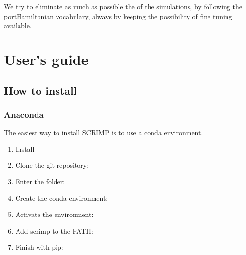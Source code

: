 \documentclass[letterpaper,10pt,english]{sphinxmanual}
\begin{document}
\sphinxAtStartPar
We try to eliminate as much as possible the  of the simulations, by following the port\sphinxhyphen{}Hamiltonian vocabulary, always by keeping the possibility of fine tuning available.


\chapter{User’s guide}
\label{\detokenize{index:user-s-guide}}
\sphinxstepscope


\section{How to install}
\label{\detokenize{install:how-to-install}}\label{\detokenize{install::doc}}

\subsection{Anaconda}
\label{\detokenize{install:anaconda}}
\sphinxAtStartPar
The easiest way to install SCRIMP is to use a conda environment.
\begin{enumerate}
%
\item {} 
\sphinxAtStartPar
Install 

\item {} 
\sphinxAtStartPar
Clone the git repository: 

\item {} 
\sphinxAtStartPar
Enter the folder: 

\item {} 
\sphinxAtStartPar
Create the conda environment:  

\item {} 
\sphinxAtStartPar
Activate the environment:  

\item {} 
\sphinxAtStartPar
Add scrimp to the PATH: 

\item {} 
\sphinxAtStartPar
Finish with pip: 

\end{enumerate}
\end{document}
